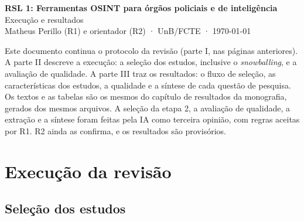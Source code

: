 

\usepackage{fixos/customizacoes}

\frenchspacing\openany
\pagestyle{simple}
\begin{center}
{\Large\bfseries RSL 1: Ferramentas OSINT para órgãos policiais e de inteligência}\\[6pt]
{\large Execução e resultados}\\[12pt]
Matheus Perillo (R1) e orientador (R2) · UnB/FCTE · \today
\end{center}
\vspace{12pt}
\noindent Este documento continua o protocolo da revisão (parte I, nas páginas anteriores). A parte II descreve a execução: a seleção dos estudos, inclusive o \textit{snowballing}, e a avaliação de qualidade. A parte III traz os resultados: o fluxo de seleção, as características dos estudos, a qualidade e a síntese de cada questão de pesquisa. Os textos e as tabelas são os mesmos do capítulo de resultados da monografia, gerados dos mesmos arquivos. A seleção da etapa 2, a avaliação de qualidade, a extração e a síntese foram feitas pela IA como terceira opinião, com regras aceitas por R1. R2 ainda as confirma, e os resultados são provisórios.

\chapter{Execução da revisão}
\section{Seleção dos estudos}
\label{sec:metodologia-selecao}
{\let\subsubsection\subsection }
{\let\subsection\section }

